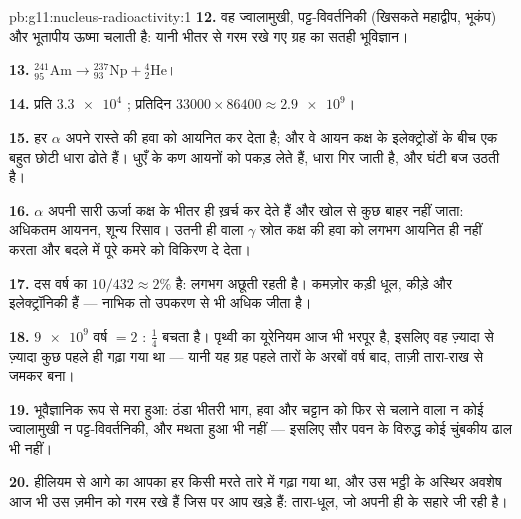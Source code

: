 \begin{solution}{pb:g11:nucleus-radioactivity:1}
\textbf{12.} वह ज्वालामुखी, पट्ट-विवर्तनिकी (खिसकते महाद्वीप, भूकंप) और
भूतापीय ऊष्मा चलाती है: यानी भीतर से गरम रखे गए ग्रह का सतही भूविज्ञान।

\textbf{13.} ${}^{241}_{95}\mathrm{Am} \to {}^{237}_{93}\mathrm{Np} +
{}^{4}_{2}\mathrm{He}$।

\textbf{14.} प्रति  $\num{3.3e4}$ ; प्रतिदिन $\num{33000} \times 86400 \approx \num{2.9e9}$।

\textbf{15.} हर $\alpha$ अपने रास्ते की हवा को आयनित कर देता है; और वे आयन
कक्ष के इलेक्ट्रोडों के बीच एक बहुत छोटी धारा ढोते हैं। धुएँ के कण आयनों को
पकड़ लेते हैं, धारा गिर जाती है, और घंटी बज उठती है।

\textbf{16.} $\alpha$ अपनी सारी ऊर्जा कक्ष के भीतर ही ख़र्च कर देते
हैं और खोल से कुछ बाहर नहीं जाता: अधिकतम आयनन, शून्य रिसाव। उतनी ही
 वाला $\gamma$ स्रोत कक्ष की हवा को लगभग आयनित ही नहीं करता
और बदले में पूरे कमरे को विकिरण दे देता।

\textbf{17.} दस वर्ष  का $10/432 \approx 2\%$ है:  लगभग
अछूती रहती है। कमज़ोर कड़ी धूल, कीड़े और इलेक्ट्रॉनिकी हैं ---
नाभिक तो उपकरण से भी अधिक जीता है।

\textbf{18.} $\num{9e9}$ वर्ष $= 2$ : $\frac14$ बचता है। पृथ्वी का
यूरेनियम आज भी भरपूर है, इसलिए वह ज़्यादा से ज़्यादा कुछ  पहले ही गढ़ा
गया था --- यानी यह ग्रह पहले तारों के अरबों वर्ष बाद, ताज़ी तारा-राख से
जमकर बना।

\textbf{19.} भूवैज्ञानिक रूप से मरा हुआ: ठंडा भीतरी भाग, हवा और चट्टान को
फिर से चलाने वाला न कोई ज्वालामुखी न पट्ट-विवर्तनिकी, और मथता हुआ  भी
नहीं --- इसलिए सौर पवन के विरुद्ध कोई चुंबकीय ढाल भी नहीं।

\textbf{20.} हीलियम से आगे का आपका हर  किसी मरते तारे में गढ़ा
गया था, और उस भट्ठी के अस्थिर अवशेष आज भी उस ज़मीन को गरम रखे हैं जिस पर आप
खड़े हैं: तारा-धूल, जो अपनी ही  के सहारे जी रही है।
\end{solution}
